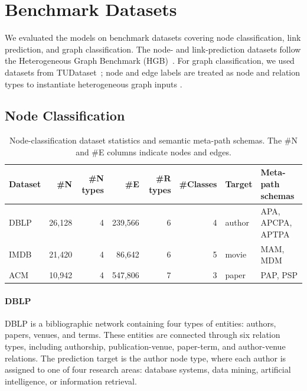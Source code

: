 \documentclass[sigconf,anonymous,review]{acmart}
\begin{document}
\section{Benchmark Datasets}
\label{app:benchmark-datasets}

We evaluated the models on benchmark datasets covering node classification,
link prediction, and graph classification. The node- and link-prediction
datasets follow the Heterogeneous Graph Benchmark (HGB)~\cite{lv2021hgb}. For graph classification, we
used datasets from TUDataset~\cite{morris2020tudataset}; node and edge labels are treated as node and relation types to instantiate heterogeneous graph inputs \cite{braithwaite2024heterogeneous}.

\subsection{Node Classification}

\begin{table}[htbp]
  \centering
  \caption{Node-classification dataset statistics and semantic meta-path schemas. The \#N and
  \#E columns indicate nodes and edges.}
  \label{tab:node-datasets}
  \scriptsize
  \setlength{\tabcolsep}{2.5pt}
  \resizebox{\columnwidth}{!}
  {%
  \begin{tabular}{lrrrrrll}
    \toprule
    \textbf{Dataset} & \textbf{\#N} & \textbf{\#N types} & \textbf{\#E} &
    \textbf{\#R types} & \textbf{\#Classes} & \textbf{Target} & \textbf{Meta-path schemas} \\
    \midrule
    DBLP & 26{,}128 & 4 & 239{,}566 & 6 & 4 & author & APA, APCPA, APTPA \\
    IMDB & 21{,}420 & 4 & 86{,}642 & 6 & 5 & movie & MAM, MDM \\
    ACM & 10{,}942 & 4 & 547{,}806 & 7 & 3 & paper & PAP, PSP \\
    \bottomrule
  \end{tabular}%
  }
\end{table}

\paragraph{DBLP}
DBLP is a bibliographic network containing four types of entities: authors,
papers, venues, and terms. These entities are connected through six relation
types, including authorship, publication-venue, paper-term, and author-venue
relations. The prediction target is the author node type, where each author is
assigned to one of four research areas: database systems, data mining,
artificial intelligence, or information retrieval.
\end{document}
